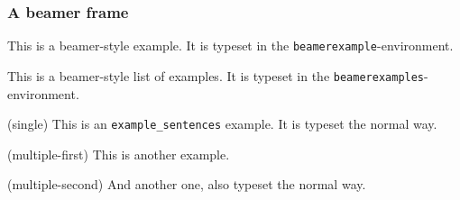 \documentclass{article}
\begin{document}
	\begin{frame}
		\frametitle{A beamer frame}
		\begin{beamerexample}
			This is a beamer-style example. It is typeset in the \texttt{beamerexample}-environment.
		 \end{beamerexample}
		\begin{beamerexamples}
			This is a beamer-style list of examples.  It is typeset in the \texttt{beamerexamples}-environment.
		\end{beamerexamples}
		
		\begin{example}
			\item(single) This is an \texttt{example\_sentences} example. It is typeset the normal way.
		\end{example}
		\begin{examples}
		 	 \item(multiple-first) This is another example.
		 	 \item(multiple-second) And another one, also typeset the normal way.
		\end{examples}
	\end{frame}
\end{document}
